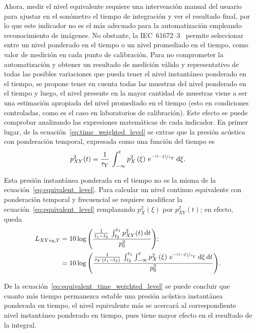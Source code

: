 Ahora, medir el nivel equivalente requiere una intervención manual del usuario para ajustar en el sonómetro el tiempo de integración y ver el resultado final, por lo que este indicador no es el más adecuado para la automatización empleando reconocimiento de imágenes.
No obstante, la \mbox{IEC 61672--3}~\citeyearpar{IEC_TC29_2013_3} permite seleccionar entre un nivel ponderado en el tiempo o un nivel promediado en el tiempo, como valor de medición en cada punto de calibración.
Para no comprometer la automatización y obtener un resultado de medición válido y representativo de todas las posibles variaciones que pueda tener el nivel instantáneo ponderado en el tiempo, se propone tener en cuenta todas las muestras del nivel ponderado en el tiempo y luego, el nivel presente en la mayor cantidad de muestras viene a ser una estimación apropiada del nivel promediado en el tiempo (esto en condiciones controladas, como es el caso en laboratorios de calibración).
Este efecto se puede comprobar analizando las expresiones matemáticas de cada indicador.
En primer lugar, de la ecuación~\eqref{eq:time_weighted_level} se extrae que la presión acústica con ponderación temporal, expresada como una función del tiempo es
%
\begin{equation}
    p_{XY}^2(t) = \frac{1}{\tau_{Y}}\,\int_{-\infty}^t p_X^2\left(\xi\right)\,
    e^{\nicefrac{-\left(t - \xi\right)}{\tau_Y}}\,\mathrm{d}\xi.
\end{equation}

Esta presión instantánea ponderada en el tiempo no es la misma de la ecuación~\eqref{eq:equivalent_level}.
Para calcular un nivel continuo equivalente con ponderación temporal y frecuencial se requiere modificar la ecuación~\eqref{eq:equivalent_level} remplazando $p_X^2(\xi)$ por $p_{XY}^2(t)$; en efecto, queda
%
\begin{align}
    L_{XYeq,T} &= 10\log{\left(\frac{\frac{1}{t_1 - t_2}\,\int_{t_2}^{t_1} p_{XY}^2(t)\,\mathrm{d}t}{p_0^2}\right)}; \nonumber \\
    &= 10\log{\left(\frac{\frac{1}{\tau_Y\,\left(t_1 - t_2\right)}\,
    \int_{t_2}^{t_1} \int_{-\infty}^t p_X^2\left(\xi\right)\,
    e^{\nicefrac{-\left(t - \xi\right)}{\tau_Y}}\,\mathrm{d}\xi\,\mathrm{d}t}{p_0^2}\right)}. \label{eq:equivalent_time_weighted_level}
\end{align}

De la ecuación~\eqref{eq:equivalent_time_weighted_level} se puede concluir que cuanto más tiempo permanezca estable una presión acústica instantánea ponderada en tiempo, el nivel equivalente más se acercará al correspondiente nivel instantáneo ponderado en tiempo, pues tiene mayor efecto en el resultado de la integral.

